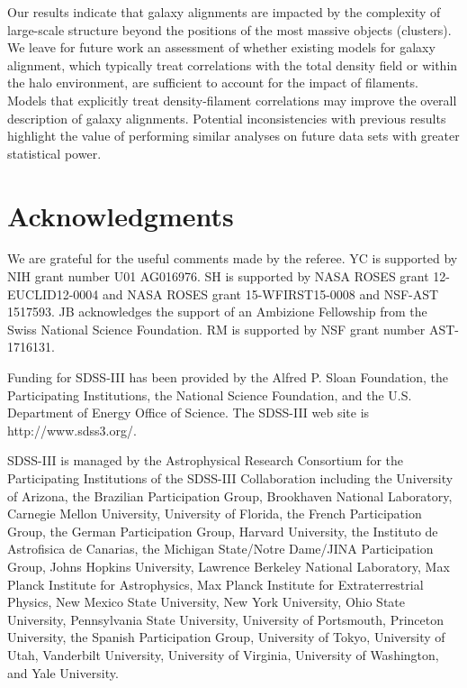 \documentclass[usenatbib,useAMS]{mnras}
\theoremstyle{remark}
\newcommand{\jab}[1]{{\textcolor{red}{JAB: #1}}}
\begin{document}
{{{\begin{itemize}
Our results indicate that galaxy alignments are impacted by the complexity of large-scale structure beyond the positions of the most massive objects (clusters). We leave for future work an assessment of whether existing models for galaxy alignment, which typically treat correlations with the total density field or within the halo environment, are sufficient to account for the impact of filaments. Models that explicitly treat density-filament correlations may improve the overall description of galaxy alignments. Potential inconsistencies with previous results highlight the value of performing similar analyses on future data sets with greater statistical power.

\end{itemize}




\section*{Acknowledgments}
We are grateful for the useful comments made by the referee. 
YC is supported by NIH grant number U01 AG016976. 
SH is supported by NASA ROSES grant 12-EUCLID12-0004 and NASA ROSES grant 15-WFIRST15-0008 and NSF-AST 1517593. 
JB acknowledges the support of an Ambizione Fellowship from the Swiss National Science Foundation.
RM is supported by NSF grant number AST-1716131.

Funding for SDSS-III has been provided by the Alfred P. Sloan Foundation, the Participating Institutions, the National Science Foundation, and the U.S. Department of Energy Office of Science. The SDSS-III web site is http://www.sdss3.org/.

SDSS-III is managed by the Astrophysical Research Consortium for the Participating Institutions of the SDSS-III Collaboration including the University of Arizona, the Brazilian Participation Group, Brookhaven National Laboratory, Carnegie Mellon University, University of Florida, the French Participation Group, the German Participation Group, Harvard University, the Instituto de Astrofisica de Canarias, the Michigan State/Notre Dame/JINA Participation Group, Johns Hopkins University, Lawrence Berkeley National Laboratory, Max Planck Institute for Astrophysics, Max Planck Institute for Extraterrestrial Physics, New Mexico State University, New York University, Ohio State University, Pennsylvania State University, University of Portsmouth, Princeton University, the Spanish Participation Group, University of Tokyo, University of Utah, Vanderbilt University, University of Virginia, University of Washington, and Yale University.


}}}
\end{document}
